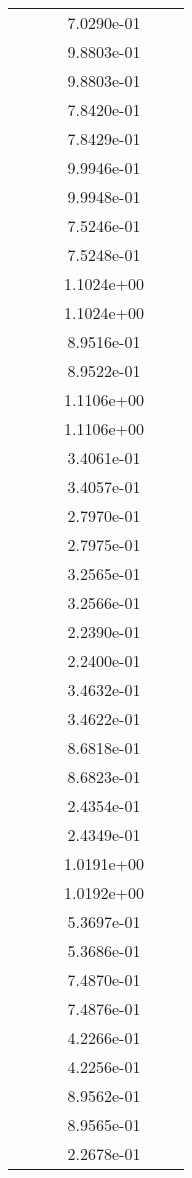 \begin{xltabular}{\textwidth}{r|rS[table-format=1.3e+2]S[table-format=1.4e+2]S[table-format=1.4e+2]S[table-format=-1.5]}
&  &  & 7.0290e-01 & & \\
&  &  & 9.8803e-01 & & \\
&  &  & 9.8803e-01 & & \\
&  &  & 7.8420e-01 & & \\
&  &  & 7.8429e-01 & & \\
&  &  & 9.9946e-01 & & \\
&  &  & 9.9948e-01 & & \\
&  &  & 7.5246e-01 & & \\
&  &  & 7.5248e-01 & & \\
&  &  & 1.1024e+00 & & \\
&  &  & 1.1024e+00 & & \\
&  &  & 8.9516e-01 & & \\
&  &  & 8.9522e-01 & & \\
&  &  & 1.1106e+00 & & \\
&  &  & 1.1106e+00 & & \\
&  &  & 3.4061e-01 & & \\
&  &  & 3.4057e-01 & & \\
&  &  & 2.7970e-01 & & \\
&  &  & 2.7975e-01 & & \\
&  &  & 3.2565e-01 & & \\
&  &  & 3.2566e-01 & & \\
&  &  & 2.2390e-01 & & \\
&  &  & 2.2400e-01 & & \\
&  &  & 3.4632e-01 & & \\
&  &  & 3.4622e-01 & & \\
&  &  & 8.6818e-01 & & \\
&  &  & 8.6823e-01 & & \\
&  &  & 2.4354e-01 & & \\
&  &  & 2.4349e-01 & & \\
&  &  & 1.0191e+00 & & \\
&  &  & 1.0192e+00 & & \\
&  &  & 5.3697e-01 & & \\
&  &  & 5.3686e-01 & & \\
&  &  & 7.4870e-01 & & \\
&  &  & 7.4876e-01 & & \\
&  &  & 4.2266e-01 & & \\
&  &  & 4.2256e-01 & & \\
&  &  & 8.9562e-01 & & \\
&  &  & 8.9565e-01 & & \\
&  &  & 2.2678e-01 & & \\

\end{xltabular}
